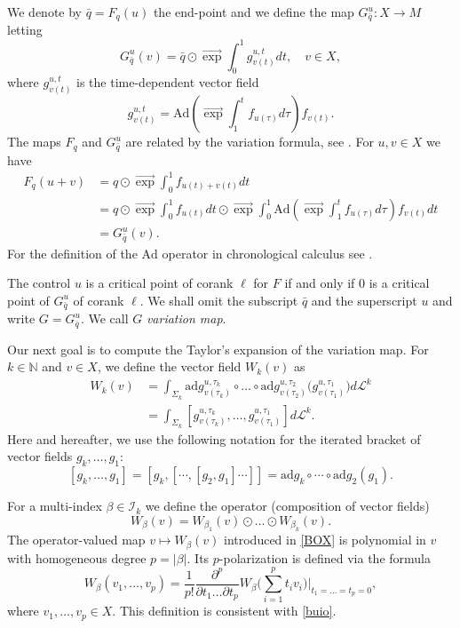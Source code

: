 \documentclass[12pt, reqno]{amsart}
\theoremstyle{plain}
\theoremstyle{definition}
\theoremstyle{remark}
\numberwithin{equation}{section}
\newcommand{\N}{\mathbb{N}}
\renewcommand{\L}{\mathcal{L}}
\newcommand{\I}{\mathcal{I}}
\newcommand{\0}{\theta}
\renewcommand{\b}{\beta}
\newcommand{\1}{{-1}}
\newcommand{\q}{\bar q}
\renewcommand{\l}{\ell}
\newcommand{\ad}{\mathrm{ad}}
\renewcommand{\=}{\coloneqq}
\renewcommand{\.}{\dots}
\newcommand{\Ad}{\mathrm{Ad}}
\newcommand{\eexp}{\overrightarrow{\exp}}
\newcommand{\be}{\begin{equation}}
\newcommand{\ee}{\end{equation}}
\begin{document}
We denote by $\q =F_{q}(u)$  the end-point and we define the map
 $G^u_{\q }:X  \to M$ letting 
\[
    G^u_{\q }(v) = \q \odot \eexp\int_0^1 g_{v(t)}^{u,t}dt,\quad v\in X ,
\]
where $ g_{v(t)}^{u,t}$ is the time-dependent vector field 
\begin{equation}
\label{gufo}
 g_{v(t)}^{u,t}=\Ad\left(\eexp\int_1^t f_{u(\tau)}d\tau\right)f_{v(t)}.
\end{equation}
The maps $F_q$ and $G^u_{\q }$ are related by the variation formula, see \cite[Formula $(2.28)$]{AgrSac}.
For 
$u,v \in X $ we have 
\begin{align*}
 F_{q}(u+v)&=q \odot \eexp\int_0^1f_{u(t)+v(t)}dt\\
 &=q\odot \eexp\int_0^1f_{u(t)}dt \odot \eexp\int_0^1\Ad\left(\eexp\int_1^t f_{u(\tau)}d\tau\right)f_{v(t)}dt
 \\
 & =  G^u_{\q }(v).
\end{align*}
For the definition of the $\Ad$ operator in chronological calculus see  \cite[Chapter 2]{AgrSac}.


The control  $u$ is a critical point of  corank $\l$
for $F$ if and only if   0 is a critical point of $ G^u_{\q }$ of corank
$\l$. We shall omit the subscript $\q $ and the superscript $u$ and write $G=G^u_{\q }$. We call $G$  \emph{variation map}.


Our next goal is to compute the Taylor's expansion of the variation map. For $k\in\N$ and $v\in X $, we define the vector field $W_k(v)$   as 
\be
 \label{ciao}
 \begin{split}
 W_k(v) & =\int_{\Sigma_k} \ad g_{v(\tau_k)}^{u,\tau_k} \circ\.\circ \ad g_{v(\tau_2)}^{u,\tau_2}\big(g_{v(\tau_1)}^{u,\tau_1}\big)d\L^k 
 \\
 & =\int_{\Sigma_k} [ g_{v(\tau_k)}^{u,\tau_k},\dots,   g_{v(\tau_1)}^{u,\tau_1}] d\L^k .
\end{split}
\ee
Here and hereafter, we use  the following notation for the iterated bracket of vector fields $g_k,\dots,g_1$:
\[
[g_k,\dots, g_1] = [ g_k , [\cdots,[g_2,g_1]\cdots]]=\ad g_ k \circ \cdots \circ\ad g_2 (g_1).
\]



For a multi-index   $ \beta \in\I_k$ we define the operator (composition of vector fields)
\begin{equation}\label{BOX}
 W_\beta (v)=W_{\beta_1}(v)\odot\.\odot W_{\beta_k}(v).
\end{equation}
The  operator-valued map  $v\mapsto W_\b (v)$ introduced in \eqref{BOX}
is polynomial in $v$ with homogeneous degree $p=|\b|$. Its $p$-polarization is defined via the formula
\begin{equation}\label{WIWA}
W_\b (v_1,\dots,v_p) =\frac{1}{p!} \frac{\partial ^p}{\partial t_1 \dots \partial t_p} 
 W_\b \Big(\sum_{i=1}^p t_i v_i\Big)\bigg| _{t_1=\dots=t_p=0}, 
\end{equation}
where $ v_1,\dots,v_p \in X $.
This definition is consistent with  \eqref{buio}.
\end{document}
